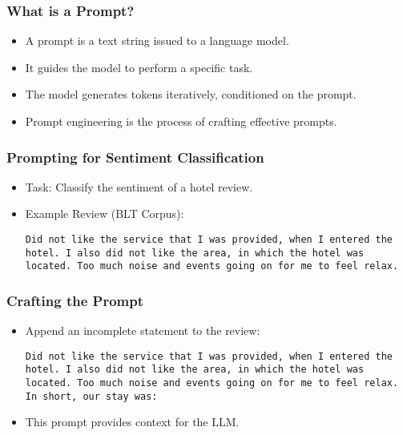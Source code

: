 \documentclass{beamer}
\begin{document}
\begin{frame}
    \frametitle{What is a Prompt?}
    \begin{itemize}
        \item A prompt is a text string issued to a language model.
        \item It guides the model to perform a specific task.
        \item The model generates tokens iteratively, conditioned on the prompt.
        \item Prompt engineering is the process of crafting effective prompts.
    \end{itemize}
\end{frame}

\begin{frame}[fragile]
    \frametitle{Prompting for Sentiment Classification}
    \begin{itemize}
        \item Task: Classify the sentiment of a hotel review.
        \item Example Review (BLT Corpus):
        \begin{verbatim}
Did not like the service that I was provided, when I entered the hotel. I also did not like the area, in which the hotel was located. Too much noise and events going on for me to feel relax.
        \end{verbatim}
    \end{itemize}
\end{frame}

\begin{frame}[fragile]
    \frametitle{Crafting the Prompt}
    \begin{itemize}
        \item Append an incomplete statement to the review:
        \begin{verbatim}
Did not like the service that I was provided, when I entered the hotel. I also did not like the area, in which the hotel was located. Too much noise and events going on for me to feel relax. In short, our stay was:
        \end{verbatim}
        \item This prompt provides context for the LLM.
    \end{itemize}
\end{frame}
\end{document}
